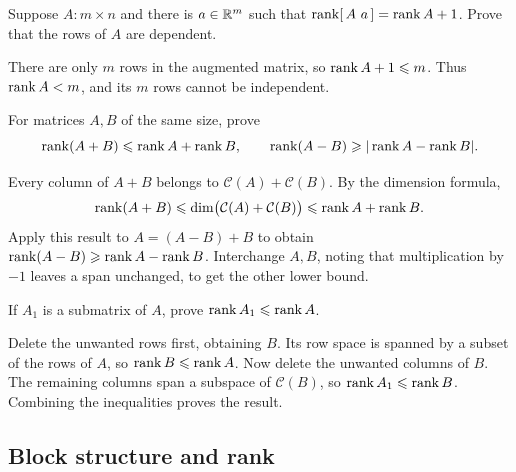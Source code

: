 \begin{problem}\label{ex:03:additional-column}
Suppose \(A:m\times n\) and there is \(a\in\mathbb R^m\) such that
\(\operatorname{rank}[\,A\ a\,]=\operatorname{rank} A+1\). Prove that the rows of \(A\) are dependent.
\end{problem}
\begin{solution}
There are only \(m\) rows in the augmented matrix, so
\(\operatorname{rank} A+1\leqslant m\). Thus \(\operatorname{rank} A<m\), and its \(m\) rows
cannot be independent.
\end{solution}

\begin{problem}\label{ex:03:rank-sum}
For matrices \(A,B\) of the same size, prove
\[
\operatorname{rank}(A+B)\leqslant\operatorname{rank} A+\operatorname{rank} B,\qquad
\operatorname{rank}(A-B)\geqslant|\operatorname{rank} A-\operatorname{rank} B|.
\]
\end{problem}
\begin{solution}
Every column of \(A+B\) belongs to \(\mathcal C(A)+\mathcal C(B)\).
By the dimension formula,
\[
\operatorname{rank}(A+B)\leqslant\dim\bigl(\mathcal C(A)+\mathcal C(B)\bigr)
\leqslant\operatorname{rank} A+\operatorname{rank} B.
\]
Apply this result to \(A=(A-B)+B\) to obtain
\(\operatorname{rank}(A-B)\geqslant\operatorname{rank} A-\operatorname{rank} B\).
Interchange \(A,B\), noting that multiplication by \(-1\) leaves a span
unchanged, to get the other lower bound.
\end{solution}

\begin{problem}\label{ex:03:submatrix}
If \(A_1\) is a submatrix of \(A\), prove \(\operatorname{rank} A_1\leqslant\operatorname{rank} A\).
\end{problem}
\begin{solution}
Delete the unwanted rows first, obtaining \(B\). Its row space is spanned
by a subset of the rows of \(A\), so \(\operatorname{rank} B\leqslant\operatorname{rank} A\).
Now delete the unwanted columns of \(B\). The remaining columns span
a subspace of \(\mathcal C(B)\), so \(\operatorname{rank} A_1\leqslant\operatorname{rank} B\).
Combining the inequalities proves the result.
\end{solution}

\subsection*{Block structure and rank}

